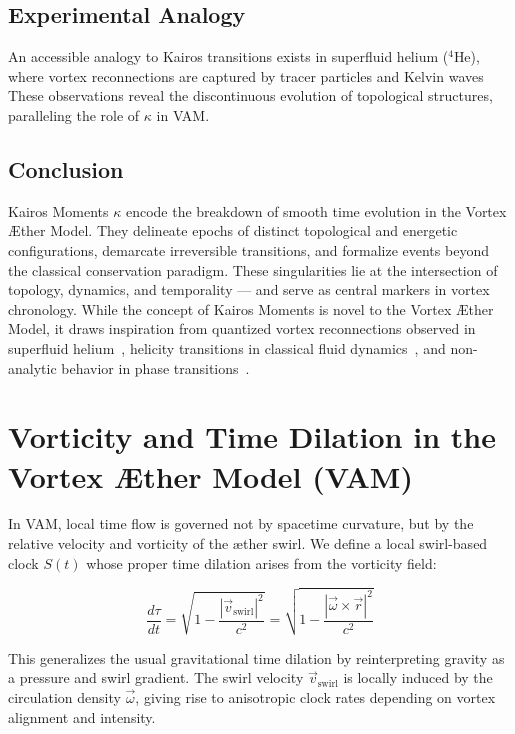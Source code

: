 \documentclass[a4paper,12pt]{article}
\begin{document}
    \subsection{Experimental Analogy}
    An accessible analogy to Kairos transitions exists in superfluid helium (\(^4\)He), where vortex reconnections are captured by tracer
    particles and Kelvin waves~\cite{bewley2006} These observations reveal the discontinuous evolution of topological structures, paralleling the role of \( \kappa \) in VAM.

    \subsection*{Conclusion}
    Kairos Moments \( \kappa \) encode the breakdown of smooth time evolution in the Vortex Æther Model. They delineate epochs of distinct
    topological and energetic configurations, demarcate irreversible transitions, and formalize events beyond the classical conservation paradigm. These singularities lie at the intersection of topology, dynamics, and temporality — and serve as central markers in vortex chronology. While the concept of Kairos Moments is novel to the Vortex Æther Model, it draws inspiration from quantized vortex reconnections observed in superfluid helium~\cite{bewley2006}, helicity transitions in classical fluid dynamics~\cite{moffatt1969}, and non-analytic behavior in phase transitions~\cite{landau1959}.


        \section{Vorticity and Time Dilation in the Vortex Æther Model (VAM)}


In VAM, local time flow is governed not by spacetime curvature, but by the relative velocity and vorticity of the æther swirl. We define a local swirl-based clock \( S(t) \) whose proper time dilation arises from the vorticity field:

\[
    \frac{d\tau}{dt} = \sqrt{1 - \frac{|\vec{v}_{\text{swirl}}|^2}{c^2}} = \sqrt{1 - \frac{|\vec{\omega} \times \vec{r}|^2}{c^2}}
\]

This generalizes the usual gravitational time dilation by reinterpreting gravity as a pressure and swirl gradient. The swirl velocity \( \vec{v}_{\text{swirl}} \) is locally induced by the circulation density \( \vec{\omega} \), giving rise to anisotropic clock rates depending on vortex alignment and intensity.
\end{document}
